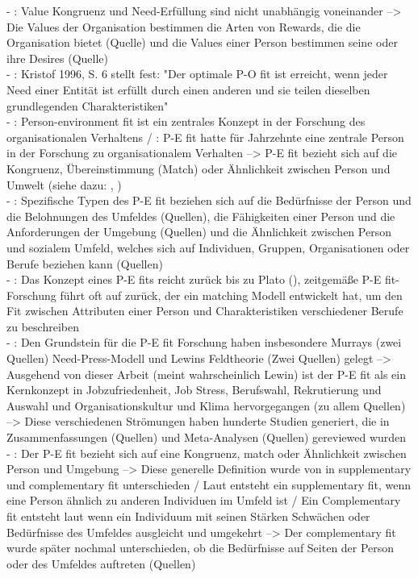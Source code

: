 - \cite[S. 3]{edwards:2004}: Value Kongruenz und Need-Erfüllung sind nicht unabhängig voneinander --> Die Values der Organisation bestimmen die Arten von Rewards, die die Organisation bietet (Quelle) und die Values einer Person bestimmen seine oder ihre Desires (Quelle) \\
- \cite[S. 4]{edwards:2004}: Kristof 1996, S. 6 stellt fest: "Der optimale P-O fit ist erreicht, wenn jeder Need einer Entität ist erfüllt durch einen anderen und sie teilen dieselben grundlegenden Charakteristiken" \\
- \cite[S. 1]{edwards:2008}: Person-environment fit ist ein zentrales Konzept in der Forschung des organisationalen Verhaltens / \cite[S. 2]{edwards:2008}: P-E fit hatte für Jahrzehnte eine zentrale Person in der Forschung zu organisationalem Verhalten --> P-E fit bezieht sich auf die Kongruenz, Übereinstimmung (Match) oder Ähnlichkeit zwischen Person und Umwelt (siehe dazu: \cite{edwards:1998}, \cite{muchinsky:1987})\\
- \cite[S. 2]{edwards:2008}: Spezifische Typen des P-E fit beziehen sich auf die Bedürfnisse der Person und die Belohnungen des Umfeldes (Quellen), die Fähigkeiten einer Person und die Anforderungen der Umgebung (Quellen) und die Ähnlichkeit zwischen Person und sozialem Umfeld, welches sich auf Individuen, Gruppen, Organisationen oder Berufe beziehen kann (Quellen) \\
- \cite[S. 2]{edwards:2008}: Das Konzept eines P-E fits reicht zurück bis zu Plato (\cite{dumont:1995}), zeitgemäße P-E fit-Forschung führt oft auf \textcite{parsons:1909} zurück, der ein matching Modell entwickelt hat, um den Fit zwischen Attributen einer Person und Charakteristiken verschiedener Berufe zu beschreiben \\
- \cite[S. 2]{edwards:2008}: Den Grundstein für die P-E fit Forschung haben insbesondere Murrays (zwei Quellen) Need-Press-Modell und Lewins Feldtheorie (Zwei Quellen) gelegt --> Ausgehend von dieser Arbeit (meint wahrscheinlich Lewin) ist der P-E fit als ein Kernkonzept in Jobzufriedenheit, Job Stress, Berufswahl, Rekrutierung und Auswahl und Organisationskultur und Klima hervorgegangen (zu allem Quellen) --> Diese verschiedenen Strömungen haben hunderte Studien generiert, die in Zusammenfassungen (Quellen) und Meta-Analysen (Quellen) gereviewed wurden \\
- \cite[S. 4]{edwards:2008}: Der P-E fit bezieht sich auf eine Kongruenz, match oder Ähnlichkeit zwischen Person und Umgebung --> Diese generelle Definition wurde von \textcite{muchinsky:1987} in supplementary und complementary fit unterschieden / Laut \cite[S. 269]{muchinsky:1987} entsteht ein supplementary fit, wenn eine Person ähnlich zu anderen Individuen im Umfeld ist / Ein Complementary fit entsteht laut \cite[S. 271]{muchinsky:1987} wenn ein Individuum mit seinen Stärken Schwächen oder Bedürfnisse des Umfeldes ausgleicht und umgekehrt --> Der complementary fit wurde später nochmal unterschieden, ob die Bedürfnisse auf Seiten der Person oder des Umfeldes auftreten (Quellen) \\
